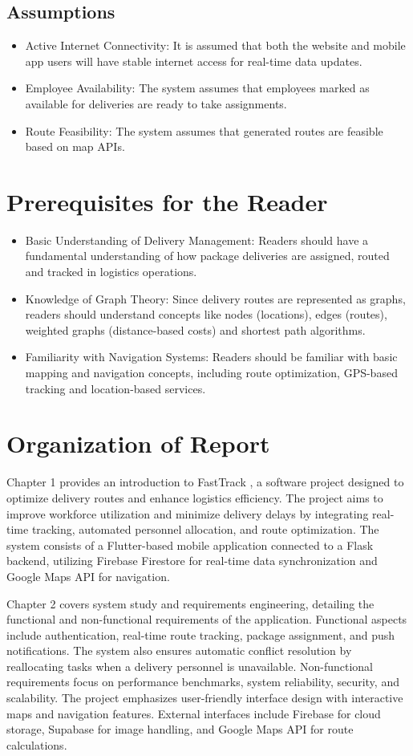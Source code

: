 \subsection{Assumptions}
\begin{itemize}
    \item  Active Internet Connectivity: It is assumed that both the website and mobile app users will have stable internet access for real-time data updates.
    \item Employee Availability: The system assumes that employees marked as available for deliveries are ready to take assignments.
    \item Route Feasibility: The system assumes that generated routes are feasible based on map APIs.
\end{itemize}
\section{Prerequisites for the Reader}
\begin{itemize}
    \item Basic Understanding of Delivery Management: Readers should have a fundamental understanding of how package deliveries are assigned, routed and tracked in logistics operations.
    \item Knowledge of Graph Theory: Since delivery routes are represented as graphs, readers should understand concepts like nodes (locations), edges (routes), weighted graphs (distance-based costs) and shortest path algorithms.
    \item Familiarity with Navigation Systems: Readers should be familiar with basic mapping and navigation concepts, including route optimization, GPS-based tracking and location-based services.
\end{itemize}
\section{Organization of Report}
Chapter 1 provides an introduction to FastTrack , a software project designed to optimize delivery routes and enhance logistics efficiency. The project aims to improve workforce utilization and minimize delivery delays by integrating real-time tracking, automated personnel allocation, and route optimization. The system consists of a Flutter-based mobile application connected to a Flask backend, utilizing Firebase Firestore for real-time data synchronization and Google Maps API for navigation.

Chapter 2 covers system study and requirements engineering, detailing the functional and non-functional requirements of the application. Functional aspects include authentication, real-time route tracking, package assignment, and push notifications. The system also ensures automatic conflict resolution by reallocating tasks when a delivery personnel is unavailable. Non-functional requirements focus on performance benchmarks, system reliability, security, and scalability. The project emphasizes user-friendly interface design with interactive maps and navigation features. External interfaces include Firebase for cloud storage, Supabase for image handling, and Google Maps API for route calculations.

